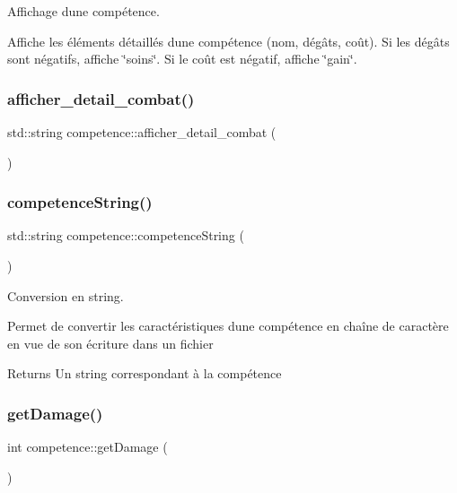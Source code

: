 Affichage d\textquotesingle{}une compétence. 

Affiche les éléments détaillés d\textquotesingle{}une compétence (nom, dégâts, coût). Si les dégâts sont négatifs, affiche \char`\"{}soins\char`\"{}. Si le coût est négatif, affiche \char`\"{}gain\char`\"{}. \mbox{\label{classcompetence_a7e0e1108a22437875609defae6515f09}} 
\subsubsection{\texorpdfstring{afficher\+\_\+detail\+\_\+combat()}{afficher\_detail\_combat()}}
{\footnotesize\ttfamily std\+::string competence\+::afficher\+\_\+detail\+\_\+combat (\begin{DoxyParamCaption}{ }\end{DoxyParamCaption})}

\mbox{\label{classcompetence_a4acc4e02f7e8c49a6d4d1db307e8f03d}} 
\subsubsection{\texorpdfstring{competence\+String()}{competenceString()}}
{\footnotesize\ttfamily std\+::string competence\+::competence\+String (\begin{DoxyParamCaption}{ }\end{DoxyParamCaption})}



Conversion en string. 

Permet de convertir les caractéristiques d\textquotesingle{}une compétence en chaîne de caractère en vue de son écriture dans un fichier \begin{DoxyReturn}{Returns}
Un string correspondant à la compétence 
\end{DoxyReturn}
\mbox{\label{classcompetence_a752380fae93494815023b3a177e57f44}} 
\subsubsection{\texorpdfstring{get\+Damage()}{getDamage()}}
{\footnotesize\ttfamily int competence\+::get\+Damage (\begin{DoxyParamCaption}{ }\end{DoxyParamCaption})}




